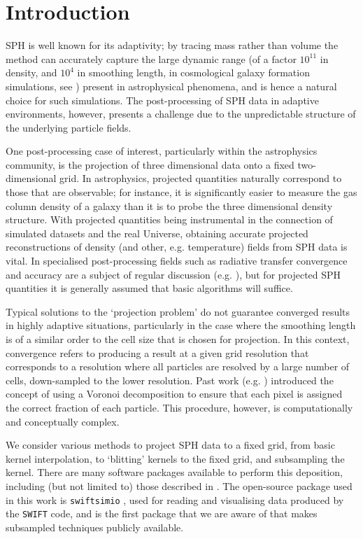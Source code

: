 \section{Introduction}
\label{sec:introduction}

SPH is well known for its adaptivity; by tracing mass rather than volume the method can accurately capture the large dynamic range (of a factor $10^{11}$ in density, and $10^4$ in smoothing length, in cosmological galaxy formation simulations, see \cite{Borrow2018}) present in astrophysical phenomena, and is hence a natural choice for such simulations. The post-processing of SPH data in adaptive environments, however, presents a challenge due to the unpredictable structure of the underlying particle fields.

One post-processing case of interest, particularly within the astrophysics community, is the projection of three dimensional data onto a fixed two-dimensional grid. In astrophysics, projected quantities naturally correspond to those that are observable; for instance, it is significantly easier to measure the gas column density of a galaxy than it is to probe the three dimensional density structure. With projected quantities being instrumental in the connection of simulated datasets and the real Universe, obtaining accurate projected reconstructions of density (and other, e.g. temperature) fields from SPH data is vital. In specialised post-processing fields such as radiative transfer convergence and accuracy are a subject of regular discussion (e.g. \cite{Yang2020}), but for projected SPH quantities it is generally assumed that basic algorithms will suffice.

Typical solutions to the `projection problem' do not guarantee converged results in highly adaptive situations, particularly in the case where the smoothing length is of a similar order to the cell size that is chosen for projection. In this context, convergence refers to producing a result at a given grid resolution that corresponds to a resolution where all particles are resolved by a large number of cells, down-sampled to the lower resolution. Past work (e.g. \cite{Koepferl2017, Petkova2018}) introduced the concept of using a Voronoi decomposition to ensure that each pixel is assigned the correct fraction of each particle. This procedure, however, is computationally and conceptually complex.

We consider various methods to project SPH data to a fixed grid, from basic kernel interpolation, to `blitting' kernels to the fixed grid, and subsampling the kernel. There are many software packages available to perform this deposition, including (but not limited to) those described in \cite{Price2007, Turk2011, Benitez-Llambay2015}. The open-source package used in this work is {\tt swiftsimio} \cite{Borrow2020a}, used for reading and visualising data produced by the {\tt SWIFT} \cite{Schaller2016} code, and is the first package that we are aware of that makes subsampled techniques publicly available.

